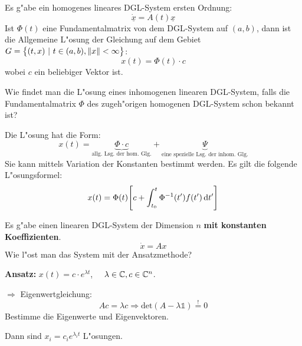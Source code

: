\documentclass[9pt]{article}
\newcommand{\C}[1]{%
	\ifthenelse{\equal{#1}{}}
	{\mathbb{C}}
	{\mathbb{C}^{#1}}}%
\renewcommand{\vec}[1]{\underline{#1}}
\newenvironment{field}{}{\newpage}
\newif\ifnote
\newenvironment{note}{\notetrue}{\notefalse}
\newcommand{\localtag}{}
\newcommand{\globaltag}{}
\newcommand{\uuid}{}
\newcommand{\tags}[1]{
    \ifnote 
        \renewcommand{\localtag}{#1}
    \else
        \renewcommand{\globaltag}{#1}
    \fi 
    }
\newcommand{\xplain}[1]{\renewcommand{\uuid}{#1}}
\begin{document}
\begin{note}
	\begin{field}  %
		Es g"abe ein homogenes lineares DGL-System  ersten Ordnung:
		\begin{equation*}
		\dot{\vec{x}} = A(t)\vec{x} 
		\end{equation*}
		Ist $\Phi(t)$ eine Fundamentalmatrix von dem DGL-System auf $(a,b)$, dann ist die Allgemeine L"osung der Gleichung auf dem Gebiet $G=\qty{(t,x) \ | \ t\in(a,b), \norm{x} < \infty}$:
		\begin{equation*}
			x(t)= \Phi(t) \cdot c
		\end{equation*}
		wobei $c$ ein beliebiger Vektor ist. 
	\end{field}
\end{note}
	\begin{note}
		\xplain{fb1f0502-666b-47eb-a9ac-f2d7c9f9277e}
		\tags{LDGL, inhomogen,3.8.7}
		
		\begin{field}  %
			Wie findet man die L"osung eines inhomogenen linearen  DGL-System, falls die Fundamentalmatrix $\Phi$ des zugeh"origen homogenen DGL-System schon bekannt ist?
		\end{field}
		
		\begin{field}  %
			Die L"osung hat die Form:
			\begin{equation*}
				x(t) = \underbrace{\Phi\cdot c}_{\text{allg. Lsg.  der hom. Glg.}} + \underbrace{\Psi}_{\text{eine spezielle Lsg. der inhom. Glg.}}
			\end{equation*}
			Sie kann mittels Variation der Konstanten bestimmt werden. Es gilt die folgende L"osungsformel:
			\begin{equation*}
				x(t) = \Phi(t)\qty[c + \int_{t_0}^{t}\Phi^{-1}(t')f(t')\dif t']
			\end{equation*}
		\end{field}
	\end{note}
	\begin{note}
		\xplain{ce3e61ed-cd0f-451f-8342-8ecea254449a}
		\tags{LDGLS, konstante-koeffizienten, 3.9}
		
		\begin{field}  %
			Es g"abe einen linearen DGL-System der Dimension $n$
			\textbf{mit konstanten Koeffizienten}.
			\begin{equation*}
				\dot{x} = Ax
			\end{equation*}
			Wie l"ost man  das System mit der Ansatzmethode? 
		\end{field}
		
		\begin{field}  %
	
			\textbf{Ansatz:} $x(t)= c \cdot e^{\lambda t}$,
				$\quad \lambda\in \C{}, c\in \C{n}$.
			
			
			$\Rightarrow$ Eigenwertgleichung:
			\begin{equation*}
				Ac = \lambda c \Rightarrow \text{det}(A - \lambda \mathbb{1}) \overset{!}{=} 0
			\end{equation*}
			Bestimme die Eigenwerte und Eigenvektoren.
			
			Dann sind $x_i = c_ie^{\lambda_i t}$ L"osungen.
		\end{field}
		\end{note}
\end{document}
